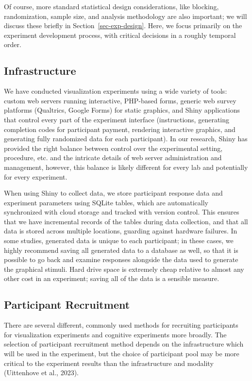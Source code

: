 \documentclass[
  10pt,
  letterpaper,
  DIV=11,
  numbers=noendperiod]{scrartcl}
\begin{document}
Of course, more standard statistical design considerations, like
blocking, randomization, sample size, and analysis methodology are also
important; we will discuss these briefly in
Section~\ref{sec-exp-design}. Here, we focus primarily on the experiment
development process, with critical decisions in a roughly temporal
order.

\subsection{Infrastructure}\label{infrastructure}

We have conducted visualization experiments using a wide variety of
tools: custom web servers running interactive, PHP-based forms, generic
web survey platforms (Qualtrics, Google Forms) for static graphics, and
Shiny applications that control every part of the experiment interface
(instructions, generating completion codes for participant payment,
rendering interactive graphics, and generating fully randomized data for
each participant). In our research, Shiny has provided the right balance
between control over the experimental setting, procedure, etc. and the
intricate details of web server administration and management, however,
this balance is likely different for every lab and potentially for every
experiment.

When using Shiny to collect data, we store participant response data and
experiment parameters using SQLite tables, which are automatically
synchronized with cloud storage and tracked with version control. This
ensures that we have incremental records of the tables during data
collection, and that all data is stored across multiple locations,
guarding against hardware failures. In some studies, generated data is
unique to each participant; in these cases, we highly recommend saving
all generated data to a database as well, so that it is possible to go
back and examine responses alongside the data used to generate the
graphical stimuli. Hard drive space is extremely cheap relative to
almost any other cost in an experiment; saving all of the data is a
sensible measure.

\subsection{Participant Recruitment}\label{participant-recruitment}

There are several different, commonly used methods for recruiting
participants for visualization experiments and cognitive experiments
more broadly. The selection of participant recruitment method depends on
the infrastructure which will be used in the experiment, but the choice
of participant pool may be more critical to the experiment results than
the infrastructure and modality (Uittenhove et al., 2023).
\end{document}
